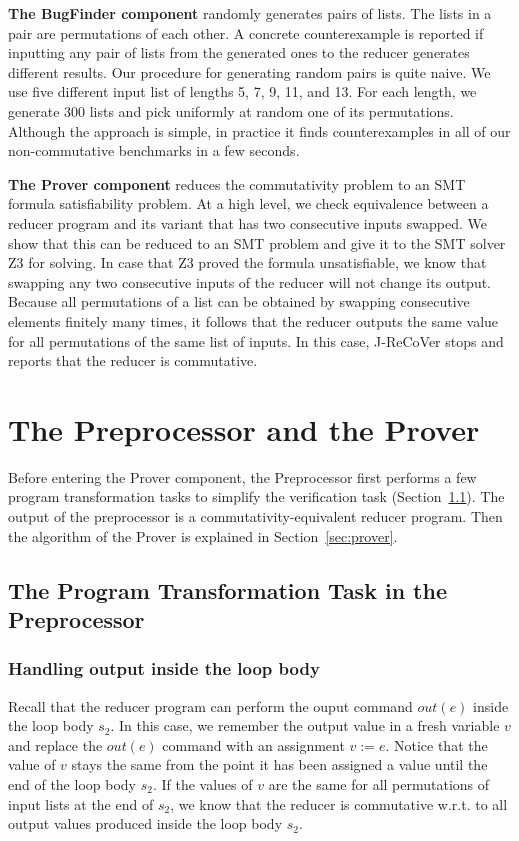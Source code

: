 \documentclass{llncs}
\begin{document}
\textbf{The BugFinder component} randomly generates pairs of lists. The lists in a pair are permutations of each other. A concrete counterexample is reported if inputting any pair of lists from the generated ones to the reducer generates different results.
Our procedure for generating random pairs is quite naive. We use five different input list of lengths 5, 7, 9, 11, and 13. For each length, we generate 300 lists and pick uniformly at random one of its permutations. Although the approach is simple, in practice it finds counterexamples in all of our non-commutative benchmarks in a few seconds. 

\textbf{The Prover component} reduces the commutativity problem to an SMT formula satisfiability problem. At a high level, we check equivalence between a reducer program and its variant that has two consecutive inputs swapped. We show that this can be reduced to an SMT problem and give it to the SMT solver Z3 for solving. In case that Z3 proved the formula unsatisfiable, we know that swapping any two consecutive inputs of the reducer will not change its output. Because all permutations of a list can be obtained by swapping consecutive elements finitely many times, it follows that the reducer outputs the same value for all permutations of the same list of inputs.
In this case,  J-ReCoVer stops and reports that the reducer is commutative.




\section{The Preprocessor and the Prover}
\label{sec:preprocessor_prover}

Before entering the Prover component, the Preprocessor first performs a few program transformation tasks to simplify the verification task (Section~\ref{sec:program_trans1}). The output of the preprocessor is a commutativity-equivalent reducer program.  Then the algorithm of the Prover is explained in Section~\ref{sec:prover}. 

\subsection{The Program Transformation Task in the Preprocessor}
\label{sec:program_trans1}
\subsubsection{Handling output inside the loop body} Recall that the reducer program can perform the ouput command $out(e)$ inside the loop body $s_2$. In this case, we remember the output value in a fresh variable $v$ and replace the $out(e)$ command with an assignment $v:=e$.
Notice that the value of $v$ stays the same from the point it has been assigned a value until the end of the loop body $s_2$.
If the values of $v$ are the same for all permutations of input lists at the end of $s_2$, we know that the reducer is commutative w.r.t. to all output values produced inside the loop body $s_2$.
\end{document}
